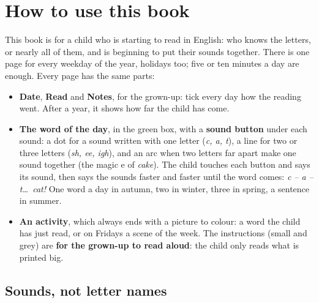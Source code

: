 \section*{How to use this book}

This book is for a child who is starting to read in English: who knows
the letters, or nearly all of them, and is beginning to put their sounds
together. There is one page for every weekday of the year, holidays
too; five or ten minutes a day are enough. Every page has the same
parts:

\begin{itemize}[leftmargin=6mm]
\item \textbf{Date}, \textbf{Read} and \textbf{Notes}, for the grown-up:
  tick every day how the reading went. After a year, it shows how far
  the child has come.
\item \textbf{The word of the day}, in the green box, with a
  \textbf{sound button} under each sound: a dot for a sound written with
  one letter (\textit{c, a, t}), a line for two or three letters
  (\textit{sh, ee, igh}), and an arc when two letters far apart make one
  sound together (the magic e of \textit{cake}). The child touches each
  button and says its sound, then says the sounds faster and faster
  until the word comes: \textit{c -- a -- t\ldots\ cat!} One word a day
  in autumn, two in winter, three in spring, a sentence in summer.
\item \textbf{An activity}, which always ends with a picture to colour:
  a word the child has just read, or on Fridays a scene of the week. The
  instructions (small and grey) are \textbf{for the grown-up to read
  aloud}: the child only reads what is printed big.
\end{itemize}

\subsection*{Sounds, not letter names}

